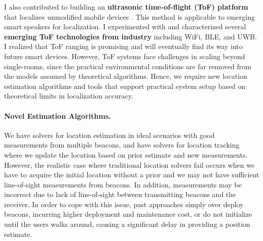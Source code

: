 \documentclass[10pt]{article}
\begin{document}
I also contributed to building an \textbf{ultrasonic time-of-flight (ToF) platform} that localizes unmodified mobile devices \cite{rtas-alps-platform, lazik2015alps,lazik2015alpsdemo}. This method is applicable to emerging smart speakers for localization. I experimented with and characterized several \textbf{emerging ToF technologies from industry} including WiFi, BLE, and UWB. %
I realized that ToF ranging is promising and will eventually find its way into future smart devices.  However, ToF systems face challenges in scaling beyond single-rooms, since the practical environmental conditions are far removed from the models assumed by theoretical algorithms. Hence, we require new location estimation algorithms and tools that support practical system setup based on theoretical limits in localization accuracy. %


\paragraph{Novel Estimation Algorithms. } 
We have solvers for location estimation in ideal scenarios with good measurements from multiple beacons, and have solvers for location tracking where we update the location based on prior estimate and new measurements. However, the realistic case where traditional location solvers fail occurs when we have to acquire the initial location without a prior and we may not have sufficient line-of-sight measurements from beacons. In addition, measurements may be incorrect due to lack of line-of-sight between transmitting beacons and the receiver. In order to cope with this issue, past approaches simply over deploy beacons, incurring higher deployment and maintenance cost, or do not initialize until the users walks around, causing a significant delay in providing a position estimate.
\end{document}
